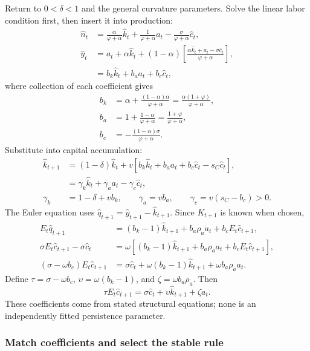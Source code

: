 Return to $0<\delta<1$ and the general curvature parameters. Solve the linear
labor condition first, then insert it into production:
\begin{align}
\hat n_t&=\frac{\alpha}{\varphi+\alpha}\hat k_t
 +\frac{1}{\varphi+\alpha}a_t
 -\frac{\sigma}{\varphi+\alpha}\hat c_t,\\
\hat y_t&=a_t+\alpha\hat k_t+(1-\alpha)
 \left[\frac{\alpha\hat k_t+a_t-\sigma\hat c_t}{\varphi+\alpha}\right],\\
&=b_k\hat k_t+b_a a_t+b_c\hat c_t,
\end{align}
where collection of each coefficient gives
\begin{align}
b_k&=\alpha+\frac{(1-\alpha)\alpha}{\varphi+\alpha}
 =\frac{\alpha(1+\varphi)}{\varphi+\alpha},\\
b_a&=1+\frac{1-\alpha}{\varphi+\alpha}
 =\frac{1+\varphi}{\varphi+\alpha},\\
b_c&=-\frac{(1-\alpha)\sigma}{\varphi+\alpha}.
\end{align}
Substitute into capital accumulation:
\begin{align}
\hat k_{t+1}&=(1-\delta)\hat k_t
 +v[b_k\hat k_t+b_a a_t+b_c\hat c_t-s_C\hat c_t],\\
&=\gamma_k\hat k_t+\gamma_a a_t-\gamma_c\hat c_t,\label{eq:rbc-reduced-k}\\
\gamma_k&=1-\delta+vb_k,\qquad
\gamma_a=vb_a,\qquad \gamma_c=v(s_C-b_c)>0.
\end{align}
The Euler equation uses $\hat q_{t+1}=\hat y_{t+1}-\hat k_{t+1}$.
Since $K_{t+1}$ is known when chosen,
\begin{align}
E_t\hat q_{t+1}
 &=(b_k-1)\hat k_{t+1}+b_a\rho_a a_t+b_cE_t\hat c_{t+1},\\
\sigma E_t\hat c_{t+1}-\sigma\hat c_t
 &=\omega[(b_k-1)\hat k_{t+1}+b_a\rho_a a_t+b_cE_t\hat c_{t+1}],\\
(\sigma-\omega b_c)E_t\hat c_{t+1}
 &=\sigma\hat c_t+\omega(b_k-1)\hat k_{t+1}+\omega b_a\rho_a a_t.
\end{align}
Define $\tau=\sigma-\omega b_c$, $\upsilon=\omega(b_k-1)$, and
$\zeta=\omega b_a\rho_a$. Then
\begin{equation}\label{eq:rbc-reduced-euler}
\tau E_t\hat c_{t+1}=\sigma\hat c_t+\upsilon\hat k_{t+1}+\zeta a_t.
\end{equation}
These coefficients come from stated structural equations; none is an
independently fitted persistence parameter.

\subsubsection{Match coefficients and select the stable rule}

